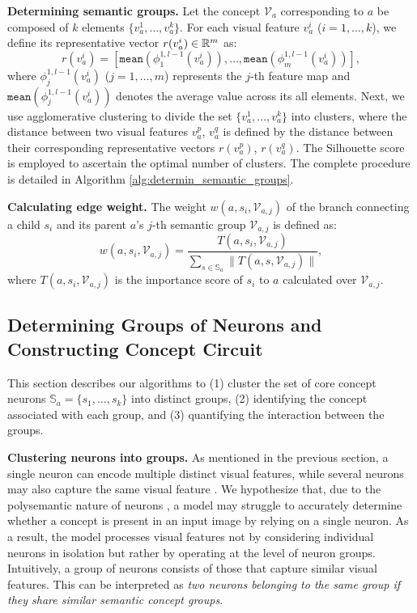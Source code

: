 \textbf{Determining semantic groups.}
 Let the concept $\mathcal{V}_a$ corresponding to $a$ be composed of $k$ elements $\{ v^1_a, \dots, v_a^k \}$.
 For each visual feature $v_a^i$ ($i = 1, \dots, k$), we define its representative vector $r(v_a^i) \in {\mathbb{R}}^m$ as:
 \begin{equation}
     r(v_a^i) = \left [ \texttt{mean}\left(\phi^{1, l-1}_1(v_a^i) \right), \dots, \texttt{mean}\left(\phi^{1, l-1}_m(v_a^i) \right) \right ],
 \end{equation}
where $\phi^{1, l-1}_j(v_a^i)$ ($j = 1, \dots, m$) represents the $j$-th feature map and $\texttt{mean}\left(\phi^{1, l-1}_j(v_a^i)\right)$ denotes the average value across its all elements.
Next, we use agglomerative clustering \citep{Agglo_clustering} to divide the set $\{v^1_a, \dots, v_a^k\}$ into clusters, where the distance between two visual features $v^p_a$, $v^q_a$ is defined by the distance between their corresponding representative vectors $r(v^p_a)$, $r(v^q_a)$. 
The Silhouette score \citep{Silhouettes} is employed to ascertain the optimal number of clusters. The complete procedure is detailed in Algorithm \ref{alg:determin_semantic_groups}.

\textbf{Calculating edge weight.} The weight $w(a, s_i, \mathcal{V}_{a,j})$ of the branch connecting a child $s_i$ and its parent $a$'s $j$-th semantic group $\mathcal{V}_{a,j}$ is defined as: 
\begin{equation}\label{equation4}
    w(a, s_i, \mathcal{V}_{a,j}) = \frac{T(a, s_i, \mathcal{V}_{a,j})}{\sum_{s\in \mathbb{S}_a} \|T(a, s, \mathcal{V}_{a,j})\|},
\end{equation}
where $T(a, s_i, \mathcal{V}_{a,j})$ is the importance score of $s_i$ to $a$ calculated over $\mathcal{V}_{a,j}$.

\subsection{Determining Groups of Neurons and Constructing Concept Circuit}
\label{concept_circuit}
\vspace{-5pt}
This section describes our algorithms to (1) cluster the set of core concept neurons $\mathbb{S}_a = \{s_1, ..., s_k\}$ into distinct groups, (2) identifying the concept associated with each group, and (3) quantifying the interaction between the groups. 

\textbf{Clustering neurons into groups.} 
As mentioned in the previous section, a single neuron can encode multiple distinct visual features, while several neurons may also capture the same visual feature \citet{Olah}. 
We hypothesize that, due to the polysemantic nature of neurons \citep{Olah, Polysemantic}, a model may struggle to accurately determine whether a concept is present in an input image by relying on a single neuron. As a result, the model processes visual features not by considering individual neurons in isolation but rather by operating at the level of neuron groups. 
Intuitively, a group of neurons consists of those that capture similar visual features. This can be interpreted as \emph{two neurons belonging to the same group if they share similar semantic concept groups}. 

